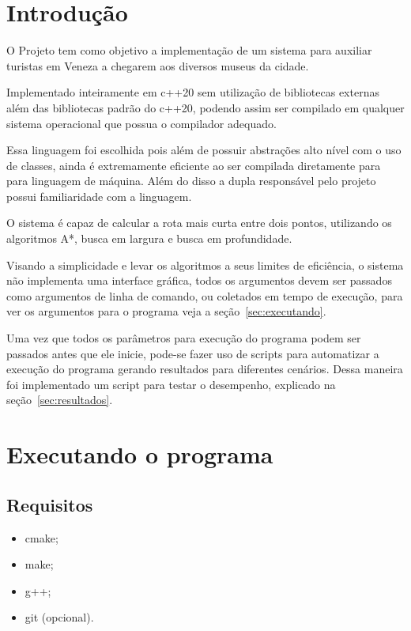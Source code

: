 \documentclass[12pt, a4paper]{article}
\begin{document}
\capa%
\tableofcontents\cleardoublepage%

\section{Introdução}\label{sec:intro}
O Projeto tem como objetivo a implementação de um sistema para auxiliar turistas em Veneza a chegarem aos diversos museus da cidade.

Implementado inteiramente em c++20 sem utilização de bibliotecas externas além das bibliotecas padrão do c++20,
podendo assim ser compilado em qualquer sistema operacional que possua o compilador adequado.

Essa linguagem foi escolhida pois além de possuir abstrações alto nível com o uso de classes,
ainda é extremamente eficiente ao ser compilada diretamente para para linguagem de máquina.
Além do disso a dupla responsável pelo projeto possui familiaridade com a linguagem.

O sistema é capaz de calcular a rota mais curta entre dois pontos,
utilizando os algoritmos A*, busca em largura e busca em profundidade.

Visando a simplicidade e levar os algoritmos a seus limites de eficiência,
o sistema não implementa uma interface gráfica,
todos os argumentos devem ser passados como argumentos de linha de comando,
ou coletados em tempo de execução, para ver os argumentos para o programa veja a seção~\ref{sec:executando}.

Uma vez que todos os parâmetros para execução do programa podem ser passados antes que ele inicie,
pode-se fazer uso de scripts para automatizar a execução do programa gerando resultados para diferentes cenários.
Dessa maneira foi implementado um script para testar o desempenho, explicado na seção~\ref{sec:resultados}.

\section{Executando o programa}\label{sec:executando_programa}
\subsection{Requisitos}\label{sec:requisitos}
\begin{itemize}
    \item cmake;
    \item make;
    \item g++;
    \item git (opcional).
\end{itemize}
\end{document}
